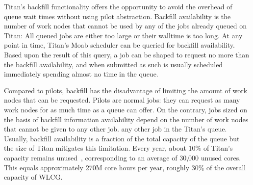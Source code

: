 Titan’s backfill functionality offers the opportunity to avoid the overhead of
queue wait times without using pilot abstraction. Backfill availability is the
number of work nodes that cannot be used by any of the jobs already queued on
Titan: All queued jobs are either too large or their walltime is too long. At
any point in time, Titan’s Moab scheduler can be queried for backfill
availability. Based upon the result of this query, a job can be shaped to
request no more than the backfill availability, and when submitted as such is
usually scheduled immediately spending almost no time in the queue.

Compared to pilots, backfill has the disadvantage of limiting the amount of work
nodes that can be requested. Pilots are normal jobs: they can request as many
work nodes for as much time as a queue can offer. On the contrary, jobs sized on
the basis of backfill information availability  depend on the number %
of work nodes that cannot be given to any other job. any other job in the
Titan's queue. Usually, backfill availability is a fraction of the
total capacity of the queue but the size of Titan mitigates this limitation.
Every year, about 10\% of Titan's capacity remains
unused~\cite{titan_utilization}, corresponding to an average of 30,000 unused
cores. This equals approximately 270M core hours per year, roughly 30\% of the
overall capacity of WLCG.


 


